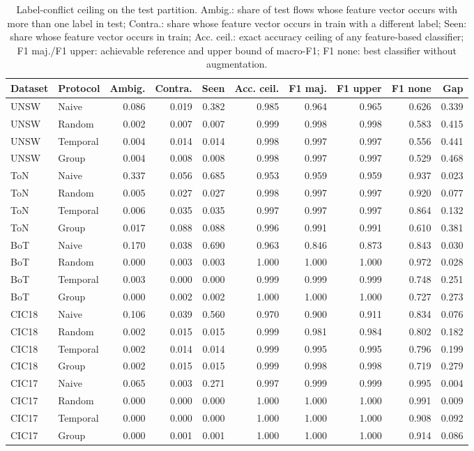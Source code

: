 \begin{table}[t]
\centering\small
\caption{Label-conflict ceiling on the test partition. Ambig.: share of test flows whose feature vector occurs with more than one label in test; Contra.: share whose feature vector occurs in train with a different label; Seen: share whose feature vector occurs in train; Acc. ceil.: exact accuracy ceiling of any feature-based classifier; F1 maj./F1 upper: achievable reference and upper bound of macro-F1; F1 none: best classifier without augmentation.}
\label{tab:ceiling}
\begin{tabular}{llrrrrrrrr}
\toprule
Dataset & Protocol & Ambig. & Contra. & Seen & Acc. ceil. & F1 maj. & F1 upper & F1 none & Gap \\
\midrule
UNSW & Naive & 0.086 & 0.019 & 0.382 & 0.985 & 0.964 & 0.965 & 0.626 & 0.339 \\
UNSW & Random & 0.002 & 0.007 & 0.007 & 0.999 & 0.998 & 0.998 & 0.583 & 0.415 \\
UNSW & Temporal & 0.004 & 0.014 & 0.014 & 0.998 & 0.997 & 0.997 & 0.556 & 0.441 \\
UNSW & Group & 0.004 & 0.008 & 0.008 & 0.998 & 0.997 & 0.997 & 0.529 & 0.468 \\
ToN & Naive & 0.337 & 0.056 & 0.685 & 0.953 & 0.959 & 0.959 & 0.937 & 0.023 \\
ToN & Random & 0.005 & 0.027 & 0.027 & 0.998 & 0.997 & 0.997 & 0.920 & 0.077 \\
ToN & Temporal & 0.006 & 0.035 & 0.035 & 0.997 & 0.997 & 0.997 & 0.864 & 0.132 \\
ToN & Group & 0.017 & 0.088 & 0.088 & 0.996 & 0.991 & 0.991 & 0.610 & 0.381 \\
BoT & Naive & 0.170 & 0.038 & 0.690 & 0.963 & 0.846 & 0.873 & 0.843 & 0.030 \\
BoT & Random & 0.000 & 0.003 & 0.003 & 1.000 & 1.000 & 1.000 & 0.972 & 0.028 \\
BoT & Temporal & 0.003 & 0.000 & 0.000 & 0.999 & 0.999 & 0.999 & 0.748 & 0.251 \\
BoT & Group & 0.000 & 0.002 & 0.002 & 1.000 & 1.000 & 1.000 & 0.727 & 0.273 \\
CIC18 & Naive & 0.106 & 0.039 & 0.560 & 0.970 & 0.900 & 0.911 & 0.834 & 0.076 \\
CIC18 & Random & 0.002 & 0.015 & 0.015 & 0.999 & 0.981 & 0.984 & 0.802 & 0.182 \\
CIC18 & Temporal & 0.002 & 0.014 & 0.014 & 0.999 & 0.995 & 0.995 & 0.796 & 0.199 \\
CIC18 & Group & 0.002 & 0.015 & 0.015 & 0.999 & 0.998 & 0.998 & 0.719 & 0.279 \\
CIC17 & Naive & 0.065 & 0.003 & 0.271 & 0.997 & 0.999 & 0.999 & 0.995 & 0.004 \\
CIC17 & Random & 0.000 & 0.000 & 0.000 & 1.000 & 1.000 & 1.000 & 0.991 & 0.009 \\
CIC17 & Temporal & 0.000 & 0.000 & 0.000 & 1.000 & 1.000 & 1.000 & 0.908 & 0.092 \\
CIC17 & Group & 0.000 & 0.001 & 0.001 & 1.000 & 1.000 & 1.000 & 0.914 & 0.086 \\
\bottomrule
\end{tabular}
\end{table}

